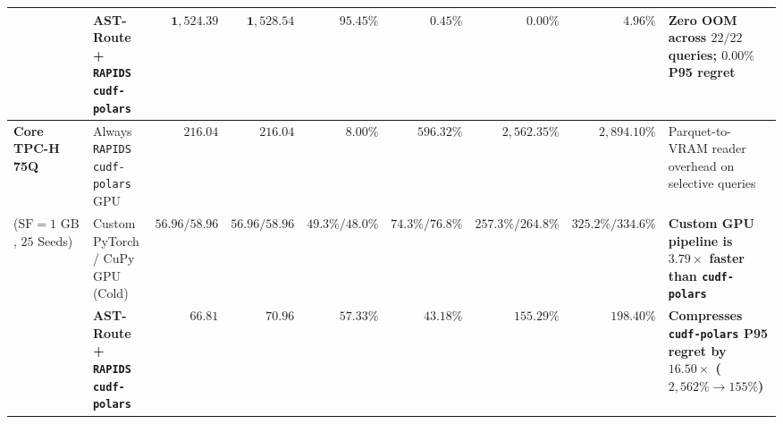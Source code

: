 \documentclass[10pt,a4paper]{article}
\begin{document}
\begin{table}[htbp]
\begin{tabular}{@{}llrrrrrrl@{}}
 & \textbf{AST-Route + \texttt{RAPIDS cudf-polars}} & $\mathbf{1{,}524.39}$ & $\mathbf{1{,}528.54}$ & $\mathbf{95.45\%}$ & $\mathbf{0.45\%}$ & $\mathbf{0.00\%}$ & $\mathbf{4.96\%}$ & \textbf{Zero OOM across $22/22$ queries; $\mathbf{0.00\%}$ P95 regret} \\
\midrule
\textbf{Core TPC-H 75Q} & Always \texttt{RAPIDS cudf-polars} GPU & $216.04$ & $216.04$ & $8.00\%$ & $596.32\%$ & $2{,}562.35\%$ & $2{,}894.10\%$ & Parquet-to-VRAM reader overhead on selective queries \\
($\text{SF}=1\text{ GB}$, $25$ Seeds) & Custom PyTorch / CuPy GPU (Cold) & $56.96 / 58.96$ & $56.96 / 58.96$ & $49.3\% / 48.0\%$ & $74.3\% / 76.8\%$ & $257.3\% / 264.8\%$ & $325.2\% / 334.6\%$ & \textbf{Custom GPU pipeline is $3.79\times$ faster than \texttt{cudf-polars}} \\
 & \textbf{AST-Route + \texttt{RAPIDS cudf-polars}} & $\mathbf{66.81}$ & $\mathbf{70.96}$ & $\mathbf{57.33\%}$ & $\mathbf{43.18\%}$ & $\mathbf{155.29\%}$ & $\mathbf{198.40\%}$ & \textbf{Compresses \texttt{cudf-polars} P95 regret by $16.50\times$ ($2{,}562\% \rightarrow 155\%$)} \\
\bottomrule
\end{tabular}
\end{table}
\end{document}
